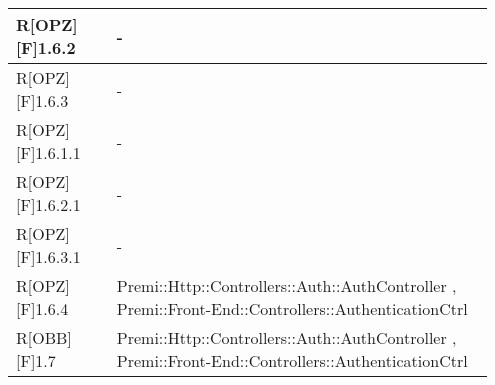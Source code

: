 \begin{table}[h]
\begin{center}
\begin{tabular}{|p{0.2\linewidth}|p{0.75\linewidth}|}
		\midrule
			R[OPZ][F]1.6.2 & -\\
		\midrule
			R[OPZ][F]1.6.3 & -\\
		\midrule
			R[OPZ][F]1.6.1.1 & -\\
		\midrule
			R[OPZ][F]1.6.2.1 & -\\
		\midrule
			R[OPZ][F]1.6.3.1 & -\\
		\midrule
			R[OPZ][F]1.6.4 & Premi::Http::Controllers::Auth::AuthController , Premi::Front-End::Controllers::AuthenticationCtrl\\
		\midrule
			R[OBB][F]1.7 & Premi::Http::Controllers::Auth::AuthController , Premi::Front-End::Controllers::AuthenticationCtrl\\
		
		\bottomrule
	\end{tabular}
\end{center}
\end{table}

